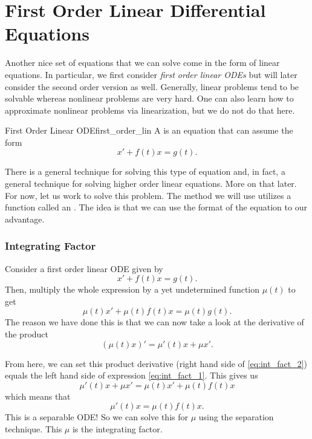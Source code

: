         \section{First Order Linear Differential Equations}

        Another nice set of equations that we can solve come in the form of linear equations.  In particular, we first consider \emph{first order linear ODEs} but will later consider the second order version as well.  Generally, linear problems tend to be solvable whereas nonlinear problems are very hard.  One can also learn how to approximate nonlinear problems via linearization, but we do not do that here.

        \begin{df}{First Order Linear ODE}{first_order_lin}
            A  is an equation that can assume the form
            \[
            x'+f(t)x=g(t).
            \]
        \end{df}

        There is a general technique for solving this type of equation and, in fact, a general technique for solving higher order linear equations.  More on that later.  For now, let us work to solve this problem.  The method we will use utilizes a function called an . The idea is that we can use the format of the equation to our advantage.

        \subsubsection{Integrating Factor}
        Consider a first order linear ODE given by
        \[
        x'+f(t)x=g(t).
        \]
        Then, multiply the whole expression by a yet undetermined function $\mu(t)$ to get
        \begin{equation}
        \mu(t)x'+\mu(t)f(t)x=\mu(t)g(t). \label{eq:int_fact_1}
        \end{equation}
        The reason we have done this is that we can now take a look at the derivative of the product
        \begin{equation}
        \left( \mu(t)x\right)'= \mu'(t)x+\mu x'. \label{eq:int_fact_2}
        \end{equation}

        From here, we can set this product derivative (right hand side of \ref{eq:int_fact_2}) equals the left hand side of expression \ref{eq:int_fact_1}.  This gives us
        \[
        \mu'(t)x+\mu x' = \mu(t)x'+\mu(t) f(t) x
        \]
        which means that
        \[
        \mu'(t)x=\mu(t) f(t) x.
        \]
        This is a separable ODE! So we can solve this for $\mu$ using the separation technique. This $\mu$ is the integrating factor.


